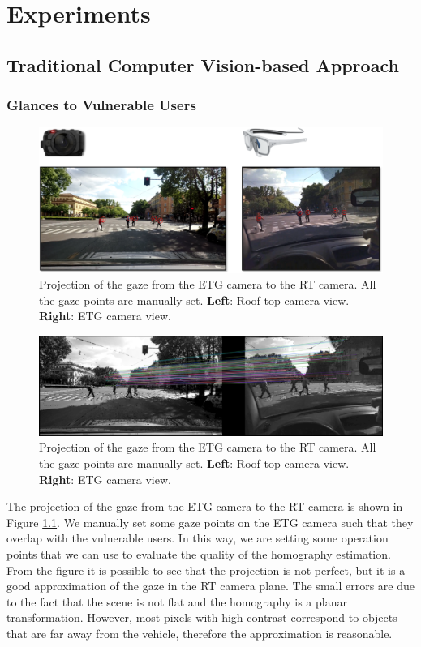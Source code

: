\chapter{Experiments}

\section{Traditional Computer Vision-based Approach}

\subsection{Glances to Vulnerable Users}
\begin{figure}
    \centering
    \includegraphics[width=\textwidth]{images/dreyeve/gaze_projection.png}
    \caption{Projection of the gaze from the ETG camera to the RT camera. 
    All the gaze points are manually set.
    \textbf{Left}: Roof top camera view.
    \textbf{Right}: ETG camera view.}
    \label{fig:gaze_projection}
\end{figure}
\begin{figure}
    \centering
    \includegraphics[width=\textwidth]{images/dreyeve/gaze_matchings.png}
    \caption{Projection of the gaze from the ETG camera to the RT camera. 
    All the gaze points are manually set.
    \textbf{Left}: Roof top camera view.
    \textbf{Right}: ETG camera view.}
    \label{fig:gaze_matchings}
\end{figure}
The projection of the gaze from the ETG camera to the RT camera is shown in 
Figure \ref{fig:gaze_projection}. We manually set some gaze points on the 
ETG camera such that they overlap with the vulnerable users. In this way, 
we are setting some operation points that we can use to evaluate the quality 
of the homography estimation. From the figure it is possible to see that the 
projection is not perfect, but it is a good approximation of the gaze in the 
RT camera plane. The small errors are due to the fact that the scene is not 
flat and the homography is a planar transformation. However, most pixels with 
high contrast correspond to objects that are far away from the vehicle, 
therefore the approximation is reasonable.

